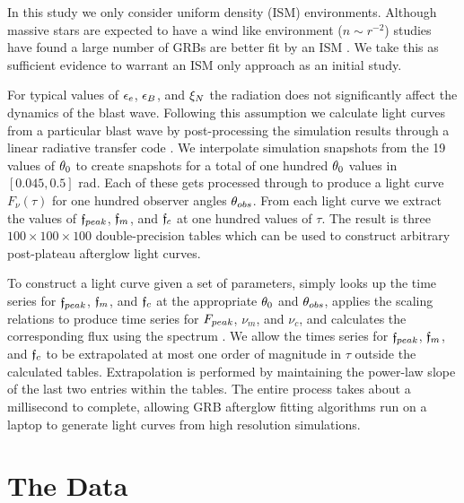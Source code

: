  In this study we only consider uniform density (ISM) environments.  Although massive stars are expected to have a wind like environment ($n\sim r^{-2}$) studies have found a large number of GRBs are better fit by an ISM \citep[e.g.][]{Racusin09,Curran11,Panaitescu01,Panaitescu02,Cenko11}.  We take this as sufficient evidence to warrant an ISM only approach as an initial study.

For typical values of $\epsilon_e$, $\epsilon_B$, and $\xi_N$ the radiation does not significantly affect the dynamics of the blast wave.  Following this assumption we calculate light curves from a particular blast wave by post-processing the simulation results through a linear radiative transfer code \blastcode{} \citep{vanEer09, vanEer10transrel}. We interpolate simulation snapshots from the 19 values of $\theta_0$ to create snapshots for a total of one hundred $\theta_0$ values in $[0.045, 0.5]$ rad.  Each of these gets processed through \blastcode{} to produce a light curve $F_\nu(\tau)$ for one hundred observer angles $\theta_{obs}$.  From each light curve we extract the values of $\mathfrak{f}_{peak}$, $\mathfrak{f}_{m}$, and $\mathfrak{f}_{c}$ at one hundred values of $\tau$.  The result is three $100\!\times\!100\!\times\!100$ double-precision tables which can be used to construct arbitrary post-plateau afterglow light curves.

To construct a light curve given a set of parameters, \scalefit{} simply looks up the time series for $\mathfrak{f}_{peak}$, $\mathfrak{f}_{m}$, and $\mathfrak{f}_{c}$ at the appropriate $\theta_0$ and $\theta_{obs}$, applies the scaling relations  to produce time series for $F_{peak}$, $\nu_m$, and $\nu_c$, and calculates the corresponding flux using the spectrum .  We allow the times series for $\mathfrak{f}_{peak}$, $\mathfrak{f}_{m}$, and $\mathfrak{f}_{c}$ to be extrapolated at most one order of magnitude in $\tau$ outside the calculated tables.  Extrapolation is performed by maintaining the power-law slope of the last two entries within the tables.  The entire process takes about a millisecond to complete, allowing GRB afterglow fitting algorithms run on a laptop to generate light curves from high resolution simulations.




\section{The Data}

